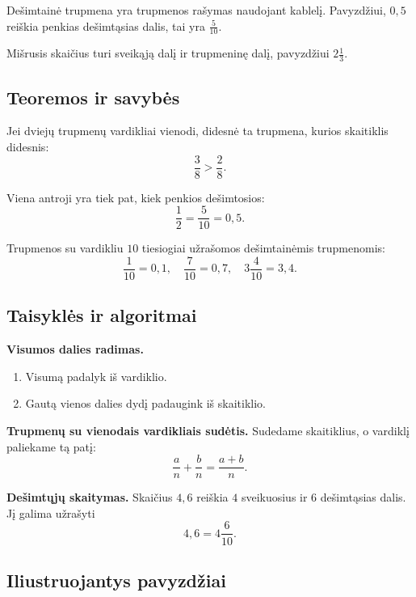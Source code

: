 \begin{apibreztis}
Dešimtainė trupmena yra trupmenos rašymas naudojant kablelį. Pavyzdžiui, \(0,5\) reiškia penkias dešimtąsias dalis, tai yra \(\frac{5}{10}\).
\end{apibreztis}

\begin{apibreztis}
Mišrusis skaičius turi sveikąją dalį ir trupmeninę dalį, pavyzdžiui \(2\frac{1}{3}\).
\end{apibreztis}

\subsection{Teoremos ir savybės}

\begin{savybe}
Jei dviejų trupmenų vardikliai vienodi, didesnė ta trupmena, kurios skaitiklis didesnis:
\[
\frac{3}{8}>\frac{2}{8}.
\]
\end{savybe}

\begin{savybe}
Viena antroji yra tiek pat, kiek penkios dešimtosios:
\[
\frac{1}{2}=\frac{5}{10}=0,5.
\]
\end{savybe}

\begin{savybe}
Trupmenos su vardikliu \(10\) tiesiogiai užrašomos dešimtainėmis trupmenomis:
\[
\frac{1}{10}=0,1,\quad \frac{7}{10}=0,7,\quad 3\frac{4}{10}=3,4.
\]
\end{savybe}

\subsection{Taisyklės ir algoritmai}

\textbf{Visumos dalies radimas.}
\begin{enumerate}[label=\arabic*.]
\item Visumą padalyk iš vardiklio.
\item Gautą vienos dalies dydį padaugink iš skaitiklio.
\end{enumerate}

\textbf{Trupmenų su vienodais vardikliais sudėtis.}
Sudedame skaitiklius, o vardiklį paliekame tą patį:
\[
\frac{a}{n}+\frac{b}{n}=\frac{a+b}{n}.
\]

\textbf{Dešimtųjų skaitymas.}
Skaičius \(4,6\) reiškia \(4\) sveikuosius ir \(6\) dešimtąsias dalis. Jį galima užrašyti
\[
4,6=4\frac{6}{10}.
\]

\subsection{Iliustruojantys pavyzdžiai}


